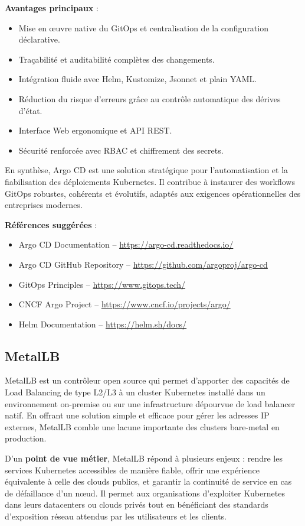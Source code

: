 \textbf{Avantages principaux} :
\begin{itemize}
	\item Mise en œuvre native du GitOps et centralisation de la configuration déclarative.
	\item Traçabilité et auditabilité complètes des changements.
	\item Intégration fluide avec Helm, Kustomize, Jsonnet et plain YAML.
	\item Réduction du risque d’erreurs grâce au contrôle automatique des dérives d’état.
	\item Interface Web ergonomique et API REST.
	\item Sécurité renforcée avec RBAC et chiffrement des secrets.
\end{itemize}

En synthèse, Argo CD est une solution stratégique pour l’automatisation et la fiabilisation des déploiements Kubernetes. Il contribue à instaurer des workflows GitOps robustes, cohérents et évolutifs, adaptés aux exigences opérationnelles des entreprises modernes.

\textbf{Références suggérées} :
\begin{itemize}
	\item Argo CD Documentation – \url{https://argo-cd.readthedocs.io/}
	\item Argo CD GitHub Repository – \url{https://github.com/argoproj/argo-cd}
	\item GitOps Principles – \url{https://www.gitops.tech/}
	\item CNCF Argo Project – \url{https://www.cncf.io/projects/argo/}
	\item Helm Documentation – \url{https://helm.sh/docs/}
\end{itemize}

\subsection{MetalLB}

MetalLB est un contrôleur open source qui permet d’apporter des capacités de Load Balancing de type L2/L3 à un cluster Kubernetes installé dans un environnement on-premise ou sur une infrastructure dépourvue de load balancer natif. En offrant une solution simple et efficace pour gérer les adresses IP externes, MetalLB comble une lacune importante des clusters bare-metal en production.

D’un \textbf{point de vue métier}, MetalLB répond à plusieurs enjeux  : rendre les services Kubernetes accessibles de manière fiable, offrir une expérience équivalente à celle des clouds publics, et garantir la continuité de service en cas de défaillance d’un nœud. Il permet aux organisations d’exploiter Kubernetes dans leurs datacenters ou clouds privés tout en bénéficiant des standards d’exposition réseau attendus par les utilisateurs et les clients.

